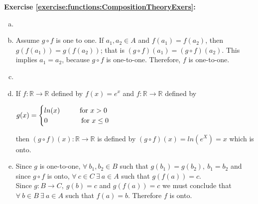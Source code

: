 \noindent\textbf{Exercise \ref{exercise:functions:CompositionTheoryExers}:} %
\begin{enumerate}[(a)]
\item \label{CompositionTheoryExers-gof11} 
  
\item \label{CompositionTheoryExers-f11} 
Assume $g\circ f$ is one to one. If $a_{1},a_{2}\in A$ and $f(a_{1}) = f(a_{2})$, then $g(f(a_{1})) = g(f(a_{2}))$; that is $(g\circ f)(a_{1}) = (g\circ f)(a_{2})$. This implies $a_{1} = a_{2}$, because $g\circ f$ is one-to-one. Therefore, $f$ is one-to-one.

\item \label{CompositionTheoryExers-gonto} 
 
\item \label{CompositionTheoryExers-egNotOnto} 
If $f\colon \mathbb{R}\to \mathbb{R}$ defined by $f(x) = e^x$ and $f\colon \mathbb{R}\to \mathbb{R}$ defined by
\begin{center}
$g(x) =
\begin{cases}
ln(x)\hspace{1cm} \text{for\ } x>0\\
0 \hspace{1.7cm} \text{for\ } x\leq 0\\
\end{cases}$
\end{center}
then $(g\circ f)(x):\mathbb{R}\to \mathbb{R}$ is  defined by $(g\circ f)(x) = ln(e^{X}) = x$ which is onto.

\item \label{CompositionTheoryExers-fonto} 
Since $g$ is one-to-one, $\forall\  b_{1},b_{2}\in B$ such that $g(b_{1}) = g(b_{2}),\ b_{1} = b_{2}$ and since $g\circ f$ is onto, $\forall\ c\in C\ \exists\ a\in A$ such that $g(f(a))=c$.\\
Since $g\colon B\to C,\ g(b) = c$ and $g(f(a)) = c$ we must conclude that $\forall\ b\in B\ \exists\ a\in A$ such that $f(a) = b$. Therefore $f$ is onto.


\end{enumerate}
